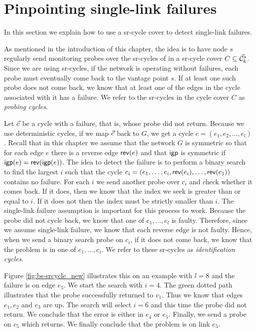 \section{Pinpointing single-link failures}

In this section we explain how to use a sr-cycle cover to detect single-link failures.

As mentioned in the introduction of this chapter, the idea is to have node $s$ 
regularly send monitoring probes over the sr-cycles of in a sr-cycle cover $C \subseteq \mathcal{\vec{C}}^s_k$. Since we are using sr-cycles,
if the network is operating without failures, each probe must eventually come back to the vantage point $s$.
If at least one such probe does not come back, we know that at least one of the edges in the cycle associated with it
has a failure. We refer to the sr-cycles in the cycle cover $C$ as \emph{probing cycles}.

Let $\vec{c}$ be a cycle with a failure, that is, whose probe did not return. 
Because we use deterministic cycles, if we map $\vec{c}$ back to $G$, we get a cycle $c = (e_1, e_2, \ldots, e_l)$.
Recall that in this chapter we assume that the network $G$ is symmetric so that for each edge $e$ there is a reverse edge $\mathsf{rev}(e)$ and that
$\mathsf{igp}$ is symmetric if $\mathsf{igp}(e) = \mathsf{rev}(\mathsf{igp}(e))$.
The idea to detect the failure is to perform a binary search to find the largest $i$ such that
the cycle $c_i = (e_1, \ldots, e_i, \mathsf{rev}(e_i), \ldots, \mathsf{rev}(e_1))$ contains no failure. For each $i$ we send another 
probe over $c_i$ and check whether it comes back. If it does, then we know that the index we seek is greater than or equal to $i$. 
If it does not then the index must be strictly smaller than $i$. The single-link failure assumption is important for this process to work.
Because the probe did not cycle back, we know that one of 
$e_1, \ldots, e_l$ is faulty. Therefore, since we assume single-link
failure, we know that each reverse edge is not faulty. Hence, when we send a binary search probe on $c_i$, if it does not come back,
we know that the problem is in one of $e_1, \ldots, e_i$. We refer to these sr-cycles as \emph{identification cycles}.

Figure \ref{fig:bs-srcycle_new} illustrates this on an example with $l = 8$ and the failure is on edge $e_5$. We start the search with $i = 4$. The green dotted path
illustrates that the probe successfully returned to $v_1$. Thus we know that edges $e_1, e_2$ and $e_3$ are up.
The search will select $i = 6$ and this time the probe did not return. We conclude that the error is either in $e_4$ or $e_5$.
Finally, we send a probe on $c_5$ which returns. We finally conclude that the problem is on link $e_5$.

